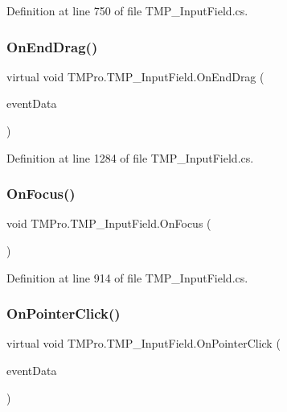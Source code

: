 Definition at line 750 of file T\+M\+P\+\_\+\+Input\+Field.\+cs.

\mbox{\label{class_t_m_pro_1_1_t_m_p___input_field_ae19fc88d3c5efaee7f436e700f16c54a}} 
\subsubsection{\texorpdfstring{OnEndDrag()}{OnEndDrag()}}
{\footnotesize\ttfamily virtual void T\+M\+Pro.\+T\+M\+P\+\_\+\+Input\+Field.\+On\+End\+Drag (\begin{DoxyParamCaption}\item[{Pointer\+Event\+Data}]{event\+Data }\end{DoxyParamCaption})\hspace{0.3cm}{\ttfamily [virtual]}}



Definition at line 1284 of file T\+M\+P\+\_\+\+Input\+Field.\+cs.

\mbox{\label{class_t_m_pro_1_1_t_m_p___input_field_ab9ec006dcffd4f1aceb65e632e224c49}} 
\subsubsection{\texorpdfstring{OnFocus()}{OnFocus()}}
{\footnotesize\ttfamily void T\+M\+Pro.\+T\+M\+P\+\_\+\+Input\+Field.\+On\+Focus (\begin{DoxyParamCaption}{ }\end{DoxyParamCaption})\hspace{0.3cm}{\ttfamily [protected]}}



Definition at line 914 of file T\+M\+P\+\_\+\+Input\+Field.\+cs.

\mbox{\label{class_t_m_pro_1_1_t_m_p___input_field_a08cbf6021ac297247b38fbb6559b7996}} 
\subsubsection{\texorpdfstring{OnPointerClick()}{OnPointerClick()}}
{\footnotesize\ttfamily virtual void T\+M\+Pro.\+T\+M\+P\+\_\+\+Input\+Field.\+On\+Pointer\+Click (\begin{DoxyParamCaption}\item[{Pointer\+Event\+Data}]{event\+Data }\end{DoxyParamCaption})\hspace{0.3cm}{\ttfamily [virtual]}}



